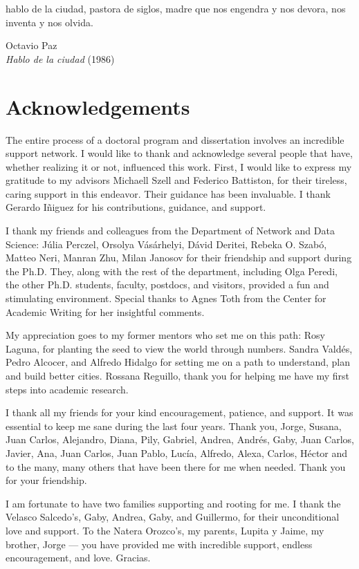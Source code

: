 \documentclass[a4paper,twoside,12pt]{book}
\begin{document}
\newpage
\frontmatter
\epigraph{hablo de la ciudad, pastora de siglos, madre que nos engendra y nos devora, nos inventa y nos olvida.}{Octavio Paz\\ \textit{Hablo de la ciudad} (1986)}
\vfill
\thispagestyle{empty}

\chapter*{Acknowledgements}
The entire process of a doctoral program and dissertation involves an incredible support network. I would like to thank and acknowledge several people that have, whether realizing it or not, influenced this work. First, I would like to express my gratitude to my advisors Michaell Szell and Federico Battiston, for their tireless, caring support in this endeavor. Their guidance has been invaluable. I thank Gerardo I\~niguez for his contributions, guidance, and support.

I thank my friends and colleagues from the Department of Network and Data Science: J\'ulia Perczel, Orsolya V\'as\'arhelyi, D\'avid Deritei, Rebeka O. Szab\'o, Matteo Neri, Manran Zhu, Milan Janosov for their friendship and support during the Ph.D. They, along with the rest of the department, including Olga Peredi, the other Ph.D. students, faculty, postdocs, and visitors, provided a fun and stimulating environment. Special thanks to Agnes Toth from the Center for Academic Writing for her insightful comments.

My appreciation goes to my former mentors who set me on this path: Rosy Laguna, for planting the seed to view the world through numbers. Sandra Vald\'es, Pedro Alcocer, and Alfredo Hidalgo for setting me on a path to understand, plan and build better cities. Rossana Reguillo, thank you for helping me have my first steps into academic research.

I thank all my friends for your kind encouragement, patience, and support. It was essential to keep me sane during the last four years. Thank you, Jorge, Susana, Juan Carlos, Alejandro, Diana, Pily, Gabriel, Andrea, Andr\'es, Gaby, Juan Carlos, Javier, Ana, Juan Carlos, Juan Pablo, Luc\'ia, Alfredo, Alexa, Carlos, H\'ector and to the many, many others that have been there for me when needed. Thank you for your friendship.

I am fortunate to have two families supporting and rooting for me. I thank the Velasco Salcedo's, Gaby, Andrea, Gaby, and  Guillermo, for their unconditional love and support. To the Natera Orozco's, my parents, Lupita y Jaime, my brother, Jorge — you have provided me with incredible support, endless encouragement, and love. Gracias.
\end{document}
